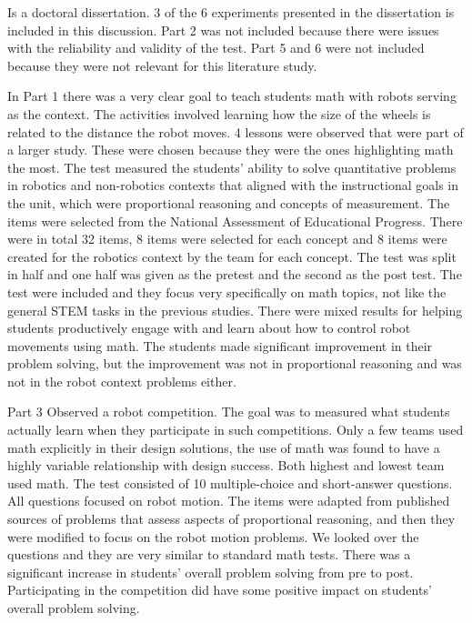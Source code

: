 \bigskip\noindent
\cite{silk2011resources} Is a doctoral dissertation. 3 of the 6 experiments presented in the dissertation is included in this discussion. Part 2 was not included because there were issues with the reliability and validity of the test. Part 5 and 6 were not included because they were not relevant for this literature study.

\bigskip\noindent
In Part 1 there was a very clear goal to teach students math with robots serving as the context. The activities involved learning how the size of the wheels is related to the distance the robot moves. 4 lessons were observed that were part of a larger study. These were chosen because they were the ones highlighting math the most. The test measured the students’ ability to solve quantitative problems in robotics and non-robotics contexts that aligned with the instructional goals in the unit, which were proportional reasoning and concepts of measurement. The items were selected from the National Assessment of Educational Progress. There were in total 32 items, 8 items were selected for each concept and 8 items were created for the robotics context by the team for each concept. The test was split in half and one half was given as the pretest and the second as the post test. The test were included and they focus very specifically on math topics, not like the general STEM tasks in the previous studies. There were mixed results for helping students productively engage with and learn about how to control robot movements using math. The students made significant improvement in their problem solving, but the improvement was not in proportional reasoning and was not in the robot context problems either. 

\bigskip\noindent
Part 3 Observed a robot competition. The goal was to measured what students actually learn when they participate in such competitions. Only a few teams used math explicitly in their design solutions, the use of math was found to have a highly variable relationship with design success. Both highest and lowest team used math. The test consisted of 10 multiple-choice and short-answer questions. All questions focused on robot motion. The items were adapted from published sources of problems that assess aspects of proportional reasoning, and then they were modified to focus on the robot motion problems. We looked over the questions and they are very similar to standard math tests. There was a significant increase in students’ overall problem solving from pre to post. Participating in the competition did have some positive impact on students’ overall problem solving.

